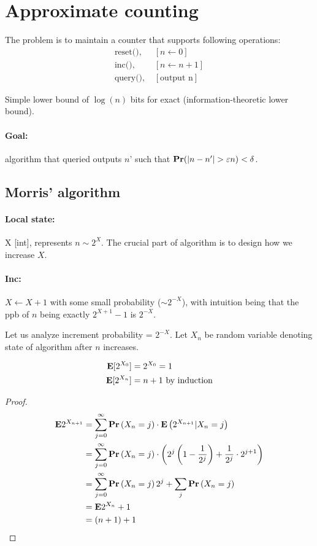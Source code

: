 \documentclass[11pt]{article}
\begin{document}

\section{Approximate counting} 
The problem is to maintain a counter that supports following operations:
\begin{align*}
\text{reset(),  } &[n\leftarrow 0]\\
\text{inc(),    } &[n\leftarrow n+1]\\
\text{query(),  } &[\text{output n}]
\end{align*}

Simple lower bound of $\log(n)$ bits for exact (information-theoretic lower bound).

\paragraph{Goal:} algorithm that queried outputs $n’$ such that $\mathbf{Pr}( |n-n'| > \varepsilon n ) < \delta$.
\subsection{Morris’ algorithm \cite{DBLP:journals/cacm/Morris78a}}
\paragraph{Local state:} X [int], represents $n \sim 2^X$. The crucial part of algorithm is to design how we increase $X$.

\paragraph{Inc: }$X \leftarrow X+1$ with some small probability ($\sim 2^{-X}$), with intuition being that the ppb of $n$ being exactly $2^{X+1}-1$ is $2^{-X}$.

Let us analyze increment probability = $2^{-X}$. Let $X_n$ be random variable denoting state of algorithm after $n$ increases.
\begin{theorem}
\begin{align}
    \mathbf{E}[2^{X_0}] &= 2^{X_0} = 1 \\
    \mathbf{E}[2^{X_n}] &= n+1 \text{  by induction}
\end{align}
\end{theorem}
\begin{proof}
\begin{align*} \mathbf{E} 2^{X_{n+1}} &=\sum_{j=0}^{\infty} \mathbf{Pr} \left(X_{n}=j\right) \cdot \mathbf{E} \left(2^{X_{n+1}} | X_{n}=j\right) \\ &=\sum_{j=0}^{\infty} \mathbf{Pr} \left(X_{n}=j\right) \cdot\left(2^{j}\left(1-\frac{1}{2^{j}}\right)+\frac{1}{2^{j}} \cdot 2^{j+1}\right) \\ &=\sum_{j=0}^{\infty} \mathbf{Pr} \left(X_{n}=j\right) 2^{j}+\sum_{j} \mathbf{Pr} \left(X_{n}=j\right) \\ &=\mathbf{E} 2^{X_{n}}+1 \\ &=(n+1)+1 \end{align*}
\end{proof}
\end{document}
